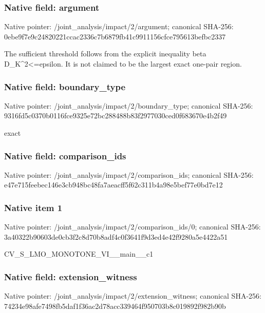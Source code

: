 \documentclass[10pt,a4paper]{article}
\begin{document}
\subsubsection{Native field: argument}
Native pointer: /joint\_\allowbreak{}analysis/impact/2/argument; canonical SHA-256: 0ebe9f7e9c24820221ccac2336c7b6879fb41c9911156cfce795613befbc2337

\begingroup\raggedright\sloppy The sufficient threshold follows from the explicit inequality beta D\_\allowbreak{}K\textasciicircum{}2<=\allowbreak{}epsilon. It is not claimed to be the largest exact one-pair region.\par\endgroup

\subsubsection{Native field: boundary\_\allowbreak{}type}
Native pointer: /joint\_\allowbreak{}analysis/impact/2/boundary\_\allowbreak{}type; canonical SHA-256: 9316fd5c0370b0116fce9325e72bc288488b83f2977030ced0f683670e4b2f49

\begingroup\raggedright\sloppy exact\par\endgroup

\subsubsection{Native field: comparison\_\allowbreak{}ids}
Native pointer: /joint\_\allowbreak{}analysis/impact/2/comparison\_\allowbreak{}ids; canonical SHA-256: e47e715feebec146e3cb948bc48fa7aeacff5f62c311b4a98e5bef77e0bd7e12

\subsubsection{Native item 1}
Native pointer: /joint\_\allowbreak{}analysis/impact/2/comparison\_\allowbreak{}ids/0; canonical SHA-256: 3a40322b90603de0cb3f2c8d70b8adf4c0f3641f9d3ed4e42f9280a5e4422a51

\begingroup\raggedright\sloppy CV\_\allowbreak{}S\_\allowbreak{}LMO\_\allowbreak{}MONOTONE\_\allowbreak{}VI\_\allowbreak{}\_\allowbreak{}main\_\allowbreak{}\_\allowbreak{}c1\par\endgroup

\subsubsection{Native field: extension\_\allowbreak{}witness}
Native pointer: /joint\_\allowbreak{}analysis/impact/2/extension\_\allowbreak{}witness; canonical SHA-256: 74234e98afe7498fb5daf1f36ac2d78acc339464f950703b8c019892f982b90b
\end{document}

